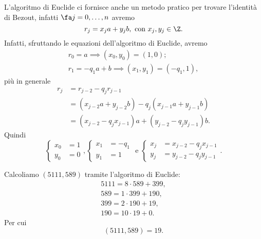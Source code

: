 \begin{oss}
	L'algoritmo di Euclide ci fornisce anche un metodo pratico per trovare l'identità di Bezout, infatti \(\fa j=0,\dots,n\) avremo
	\[
		r_j=x_j a+y_j b,\text{ con }x_j,y_j\in\Z.
	\]
	Infatti, sfruttando le equazioni dell'algoritmo di Euclide, avremo
	\begin{gather*}
		r_0 = a\implies (x_0,y_0)=(1,0);\\
		r_1 = -q_1 a+b\implies (x_1,y_1)=(-q_1,1),
	\end{gather*}
	più in generale
	\[
		\begin{split}
			r_j & =r_{j-2}-q_j r_{j-1}\\
			& =(x_{j-2}a+y_{j-2}b)-q_j(x_{j-1}a+y_{j-1}b)\\
			& =(x_{j-2}-q_j x_{j-1})a+(y_{j-2}-q_j y_{j-1})b.
		\end{split}
	\]
	Quindi
	\[
		\left\{
		\begin{aligned}
			x_0 & =1 \\
			y_0 & =0
		\end{aligned}
		\right. ,\left\{
		\begin{aligned}
			x_1 & =-q_1 \\
			y_1 & =1
		\end{aligned}
		\right. \text{ e }\left\{
		\begin{aligned}
			x_j & =x_{j-2}-q_j x_{j-1} \\
			y_j & =y_{j-2}-q_j y_{j-1}
		\end{aligned}
		\right. .
	\]
\end{oss}

\begin{ese}
	Calcoliamo \((5111,589)\) tramite l'algoritmo di Euclide:
	\begin{gather*}
		5111=8\cdot 589+399,\\
		589=1\cdot 399+190,\\
		399=2\cdot 190+19,\\
		190=10\cdot 19+0.
	\end{gather*}
	Per cui
	\[
		(5111,589)=19.
	\]
\end{ese}

